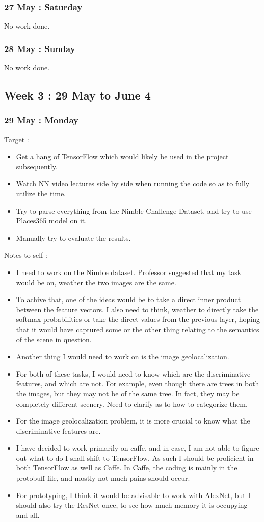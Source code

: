 \documentclass{article}
\begin{document}
\subsubsection{27 May : Saturday}
No work done.
\subsubsection{28 May : Sunday}
No work done.

\subsection{Week 3 : 29 May to June 4}
\subsubsection{29 May : Monday}
Target :
\begin{itemize}
\item Get a hang of TensorFlow which would likely be used in the project subsequently.
\item Watch NN video lectures side by side when running the code so as to fully utilize the time. 
\item Try to parse everything from the Nimble Challenge Dataset, and try to use Places365 model on it.
\item Manually try to evaluate the results.
\end{itemize}

Notes to self : 
\begin{itemize}
\item I need to work on the Nimble dataset. Professor suggested that my task would be on, weather the two images are the same.
\item To achive that, one of the ideas would be to take a direct inner product between the feature vectors. I also need to think, weather to directly take the softmax probabilities or take the direct values from the previous layer, hoping that it would have captured some or the other thing relating to the semantics of the scene in question.
\item Another thing I would need to work on is the image geolocalization.
\item For both of these tasks, I would need to know which are the discriminative features, and which are not. For example, even though there are trees in both the images, but they may not be of the same tree. In fact, they may be completely different scenery. Need to clarify as to how to categorize them.
\item For the image geolocalization problem, it is more crucial to know what the discriminative features are.
\item I have decided to work primarily on caffe, and in case, I am not able to figure out what to do I shall shift to TensorFlow. As such I should be proficient in both TensorFlow as well as Caffe. In Caffe, the coding is mainly in the protobuff file, and mostly not much pains should occur.
\item For prototyping, I think it would be advisable to work with AlexNet, but I should also try the ResNet once, to see how much memory it is occupying and all.
\end{itemize}
\end{document}
